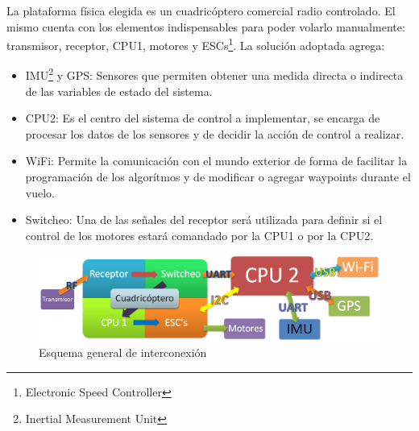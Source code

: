 \documentclass[main]{subfiles}
\begin{document}
La plataforma f\'isica elegida es un cuadric\'optero comercial radio controlado. El mismo cuenta con los elementos indispensables para poder volarlo manualmente: transmisor, receptor, CPU1, motores y ESCs\footnote{Electronic Speed Controller}. La soluci\'on adoptada agrega:
\begin{itemize}
\item IMU\footnote{Inertial Measurement Unit} y GPS: Sensores que permiten obtener una medida directa o indirecta de las variables de estado del sistema. 
\item CPU2: Es el centro del sistema de control a implementar, se encarga de procesar los datos de los sensores y de decidir la acci\'on de control a realizar. 
\item WiFi: Permite la comunicaci\'on con el mundo exterior de forma de facilitar la programaci\'on de los algor\'itmos y de modificar o agregar waypoints durante el vuelo. 
\item Switcheo: Una de las señales del receptor ser\'a utilizada para definir si el control de los motores estar\'a comandado por la CPU1 o por la CPU2. 
\end{itemize}

\begin{figure}[h!]
  \centering
  \includegraphics[width=1\textwidth]{./pics_general/diagrama_gral.png}
  \caption{Esquema general de interconexi\'on}
  \label{fig:esquema_gral}
\end{figure}
\end{document}
